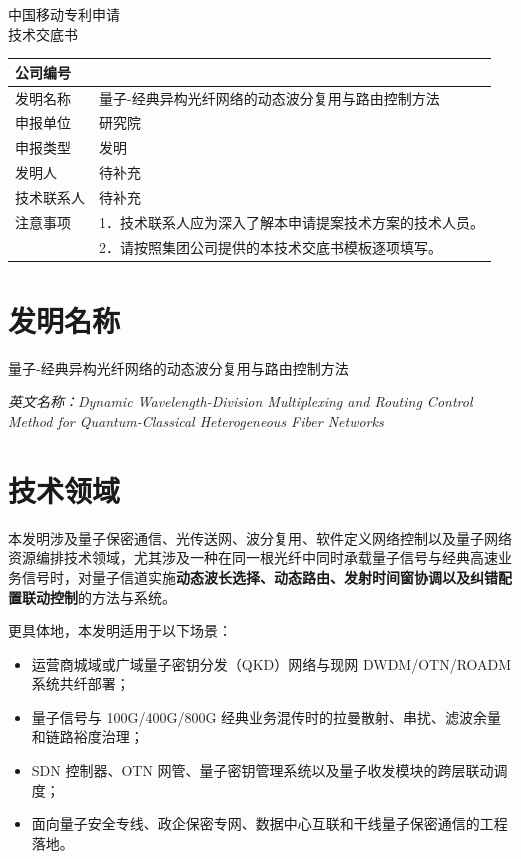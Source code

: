 \documentclass[12pt,a4paper]{article}
\begin{document}
\begin{center}
    {\Large\heiti 中国移动专利申请} \\[1em]
    {\Huge\heiti 技术交底书} \\[1em]
\end{center}

\noindent
{
\begin{tabular}{|L{2.8cm}|L{11.8cm}|}
\hline
公司编号 &  \\
\hline
发明名称 & 量子-经典异构光纤网络的动态波分复用与路由控制方法 \\
\hline
申报单位 & 研究院 \\
\hline
申报类型 & 发明 \\
\hline
发明人 & 待补充 \\
\hline
技术联系人 & 待补充 \\
\hline
注意事项 & 1．技术联系人应为深入了解本申请提案技术方案的技术人员。 \\
         & 2．请按照集团公司提供的本技术交底书模板逐项填写。 \\
\hline
\end{tabular}
}

\vspace{1cm}

\section{发明名称}

量子-经典异构光纤网络的动态波分复用与路由控制方法

\textit{英文名称：Dynamic Wavelength-Division Multiplexing and Routing Control Method for Quantum-Classical Heterogeneous Fiber Networks}

\section{技术领域}

本发明涉及量子保密通信、光传送网、波分复用、软件定义网络控制以及量子网络资源编排技术领域，尤其涉及一种在同一根光纤中同时承载量子信号与经典高速业务信号时，对量子信道实施\textbf{动态波长选择、动态路由、发射时间窗协调以及纠错配置联动控制}的方法与系统。

更具体地，本发明适用于以下场景：
\begin{itemize}[noitemsep]
    \item 运营商城域或广域量子密钥分发（QKD）网络与现网 DWDM/OTN/ROADM 系统共纤部署；
    \item 量子信号与 100G/400G/800G 经典业务混传时的拉曼散射、串扰、滤波余量和链路裕度治理；
    \item SDN 控制器、OTN 网管、量子密钥管理系统以及量子收发模块的跨层联动调度；
    \item 面向量子安全专线、政企保密专网、数据中心互联和干线量子保密通信的工程落地。
\end{itemize}
\end{document}
